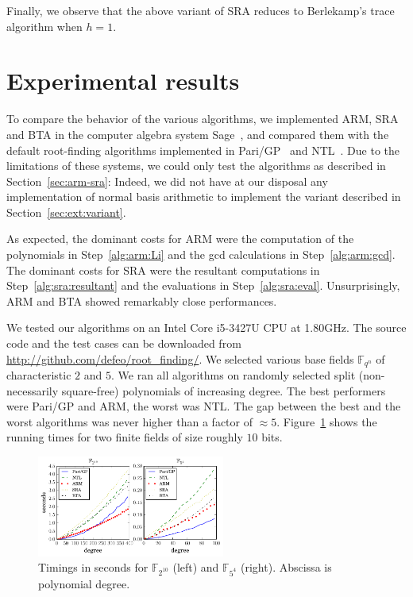 \documentclass{sig-alternate}
\newcommand{\ff}[1]{\mathbb{F}_{#1}}
\newcommand{\qq}{q}
\newcommand{\nn}{n}
\newcommand{\qn}{{\qq^\nn}}
\newcommand{\extf}{\ff{\qn}}
\newcounter{algo}
\begin{document}
Finally, we observe that the above variant of SRA reduces to Berlekamp's trace algorithm when $h=1$.




\section{Experimental results}

To compare the behavior of the various algorithms, we implemented ARM,
SRA and BTA in the computer algebra system Sage~\cite{Sage}, and
compared them with the default root-finding algorithms implemented in
Pari/GP~\cite{Pari} and NTL~\cite{ntl}. Due to the limitations of
these systems, we could only test the algorithms as described in
Section~\ref{sec:arm-sra}: Indeed, we did not have at our disposal any
implementation of normal basis arithmetic to implement the variant
described in Section~\ref{sec:ext:variant}.

As expected, the dominant costs for ARM were the computation of the
polynomials in Step~\ref{alg:arm:Li} and the gcd calculations in
Step~\ref{alg:arm:gcd}. The dominant costs for SRA were the resultant
computations in Step~\ref{alg:sra:resultant} and the evaluations in
Step~\ref{alg:sra:eval}. Unsurprisingly, ARM and BTA showed remarkably
close performances.

We tested our algorithms on an Intel Core i5-3427U CPU at 1.80GHz. The
source code and the test cases can be downloaded from
\url{http://github.com/defeo/root_finding/}. We selected various base
fields $\extf$ of characteristic $2$ and $5$. We ran all algorithms on
randomly selected split (non-necessarily square-free) polynomials of
increasing degree. The best performers were Pari/GP and ARM, the worst
was NTL. The gap between the best and the worst algorithms was never
higher than a factor of $\approx 5$. Figure~\ref{fig:benchmarks} shows
the running times for two finite fields of size roughly $10$ bits.

\begin{figure}
  \hspace{-0.05\textwidth}
  \includegraphics[width=0.55\textwidth]{benchmark}
  \caption{Timings in seconds for $\ff{2^{10}}$ (left) and $\ff{5^4}$
    (right). Abscissa is polynomial degree.}
  \label{fig:benchmarks}
\end{figure}
\end{document}
